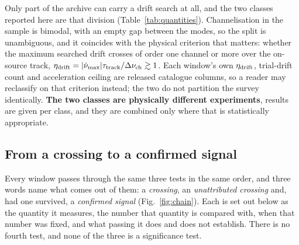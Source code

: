 Only part of the archive can carry a drift search at all, and the two
classes reported here are that division (Table~\ref{tab:quantities}).
Channelisation in the sample is bimodal, with an empty gap between the modes,
so the split is unambiguous, and it coincides with the physical criterion
that matters: whether the maximum searched drift crosses of order one channel
or more over the on-source track, $\eta_{\rm drift} =
|\dot\nu_{\max}|\tau_{\rm track}/\Delta\nu_{\rm ch} \gtrsim 1$. Each
window's own $\eta_{\rm drift}$, trial-drift count and acceleration ceiling
are released catalogue columns, so a reader may reclassify on that criterion
instead; the two do not partition the survey identically. \textbf{The two
classes are physically different experiments}, results are given per class,
and they are combined only where that is statistically appropriate.

\subsection{From a crossing to a confirmed signal}
\label{sec:summary}

Every window passes through the same three tests in the same order, and
three words name what comes out of them: a \emph{crossing}, an
\emph{unattributed crossing} and, had one survived, a \emph{confirmed
signal} (Fig.~\ref{fig:chain}). Each is set out below as the quantity it
measures, the number that quantity is compared with, when that number was
fixed, and what passing it does and does not establish. There is no fourth
test, and none of the three is a significance test.

